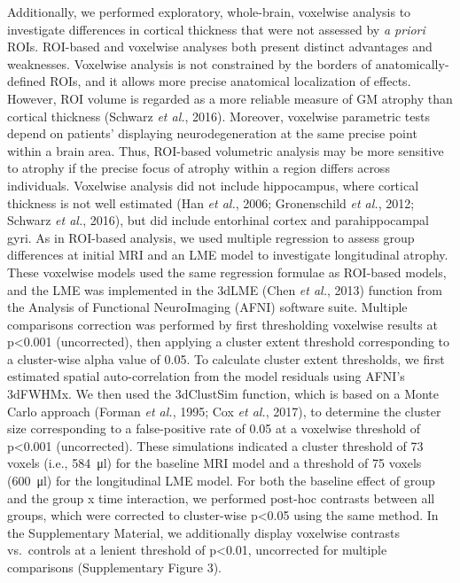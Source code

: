 \documentclass[]{article}
\begin{document}
Additionally, we performed exploratory, whole-brain, voxelwise analysis
to investigate differences in cortical thickness that were not assessed
by \emph{a priori} ROIs. ROI-based and voxelwise analyses both present
distinct advantages and weaknesses. Voxelwise analysis is not
constrained by the borders of anatomically-defined ROIs, and it allows
more precise anatomical localization of effects. However, ROI volume is
regarded as a more reliable measure of GM atrophy than cortical
thickness (Schwarz \emph{et al.}, 2016). Moreover, voxelwise parametric
tests depend on patients' displaying neurodegeneration at the same
precise point within a brain area. Thus, ROI-based volumetric analysis
may be more sensitive to atrophy if the precise focus of atrophy within
a region differs across individuals. Voxelwise analysis did not include
hippocampus, where cortical thickness is not well estimated (Han
\emph{et al.}, 2006; Gronenschild \emph{et al.}, 2012; Schwarz \emph{et
al.}, 2016), but did include entorhinal cortex and parahippocampal gyri.
As in ROI-based analysis, we used multiple regression to assess group
differences at initial MRI and an LME model to investigate longitudinal
atrophy. These voxelwise models used the same regression formulae as
ROI-based models, and the LME was implemented in the 3dLME (Chen
\emph{et al.}, 2013) function from the Analysis of Functional
NeuroImaging (AFNI) software suite. Multiple comparisons correction was
performed by first thresholding voxelwise results at p\textless{}0.001
(uncorrected), then applying a cluster extent threshold corresponding to
a cluster-wise alpha value of 0.05. To calculate cluster extent
thresholds, we first estimated spatial auto-correlation from the model
residuals using AFNI's 3dFWHMx. We then used the 3dClustSim function,
which is based on a Monte Carlo approach (Forman \emph{et al.}, 1995;
Cox \emph{et al.}, 2017), to determine the cluster size corresponding to
a false-positive rate of 0.05 at a voxelwise threshold of
p\textless{}0.001 (uncorrected). These simulations indicated a cluster
threshold of 73 voxels (i.e., \SI{584}{\micro\litre}) for the baseline
MRI model and a threshold of 75 voxels (\SI{600}{\micro\litre}) for the
longitudinal LME model. For both the baseline effect of group and the
group x time interaction, we performed post-hoc contrasts between all
groups, which were corrected to cluster-wise p\textless{}0.05 using the
same method. In the Supplementary Material, we additionally display
voxelwise contrasts vs.~controls at a lenient threshold of
p\textless{}0.01, uncorrected for multiple comparisons (Supplementary
Figure 3).
\end{document}
